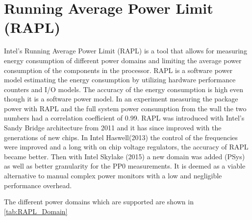 \section{Running Average Power Limit (RAPL)}
Intel's Running Average Power Limit (RAPL) is a tool that allows for measuring energy consumption of different power domains and  limiting the average power consumption of the components in the processor. RAPL is a software power model estimating the energy consumption by utilizing hardware performance counters and I/O models.\cite{Power-Management_Sandy_Bridge} The accuracy of the energy consumption is  high even though it is a software power model\cite{RAPL_ACU1,RAPL_ACU2}. In an experiment measuring the package power with RAPL and the full system power consumption from the wall the two numbers had a correlation coefficient of 0.99.\cite{RAPL_in_action} RAPL was introduced with Intel's Sandy Bridge architecture from 2011 and it has since improved with the generations of new chips. In Intel Haswell(2013) the control of the frequencies were improved and a long with on chip voltage regulators, the accuracy of RAPL became better. Then with Intel Skylake (2015) a new domain was added (PSys) as well as better granularity for the PP0 measurements. It is deemed as   a viable alternative to manual complex power monitors with a low and negligible performance overhead. \cite{RAPL_in_action}

The different power domains which are supported are shown in \cref{tab:RAPL_Domain}\nytafsnit


